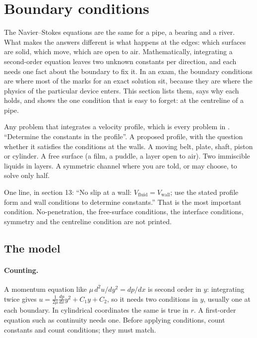 \section{Boundary conditions}
\label{sec:bcs}

The Navier--Stokes equations are the same for a pipe, a bearing and a river. What makes the answers different is what happens at the edges: which surfaces are solid, which move, which are open to air. Mathematically, integrating a second-order equation leaves two unknown constants per direction, and each needs one fact about the boundary to fix it. In an exam, the boundary conditions are where most of the marks for an exact solution sit, because they are where the physics of the particular device enters. This section lists them, says why each holds, and shows the one condition that is easy to forget: at the centreline of a pipe.

\begin{recognise}
Any problem that integrates a velocity profile, which is every problem in . ``Determine the constants in the profile''. A proposed profile, with the question whether it satisfies the conditions at the walls. A moving belt, plate, shaft, piston or cylinder. A free surface (a film, a puddle, a layer open to air). Two immiscible liquids in layers. A symmetric channel where you are told, or may choose, to solve only half.
\end{recognise}

\begin{onsheet}
One line, in section 13: ``No slip at a wall: $V_{\text{fluid}} = V_{\text{wall}}$; use the stated profile form and wall conditions to determine constants.'' That is the most important condition. No-penetration, the free-surface conditions, the interface conditions, symmetry and the centreline condition are not printed.
\end{onsheet}

\subsection*{The model}

\paragraph{Counting.} A momentum equation like $\mu\,d^2u/dy^2 = dp/dx$ is second order in $y$: integrating twice gives $u = \frac{1}{2\mu}\frac{dp}{dx}y^2 + C_1y + C_2$, so it needs two conditions in $y$, usually one at each boundary. In cylindrical coordinates the same is true in $r$. A first-order equation such as continuity needs one. Before applying conditions, count constants and count conditions; they must match.

